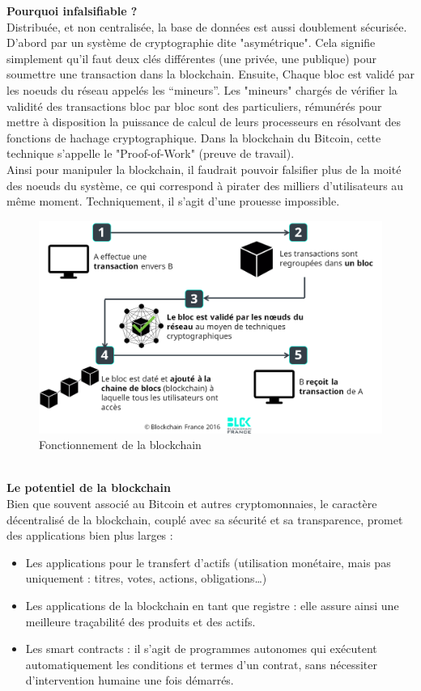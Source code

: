 \documentclass[conference]{IEEEtran}
\begin{document}
\textbf{Pourquoi infalsifiable ? } \\
Distribuée, et non centralisée, la base de données est aussi doublement sécurisée. D'abord par un système de cryptographie dite "asymétrique". Cela signifie simplement qu'il faut deux clés différentes (une privée, une publique) pour soumettre une transaction dans la blockchain. Ensuite, Chaque bloc est validé par les noeuds du réseau appelés les “mineurs”. Les "mineurs" chargés de vérifier la validité des transactions bloc par bloc sont des particuliers, rémunérés pour mettre à disposition la puissance de calcul de leurs processeurs en résolvant des fonctions de hachage cryptographique. Dans la blockchain du Bitcoin, cette technique s'appelle le "Proof-of-Work" (preuve de travail). \cite{7x7} \\
Ainsi pour manipuler la blockchain, il faudrait pouvoir falsifier plus de la moité des noeuds du système, ce qui correspond à pirater des milliers d'utilisateurs au même moment. Techniquement, il s’agit d’une prouesse impossible. \\
\begin{subfigure}
    \centering
    \includegraphics[scale=0.3]{blck-fonctionnement.png}
    \caption{Fonctionnement de la blockchain}
    \label{fig:blck-fonctionnement}
\end{subfigure}
\vspace{0.3cm}\\
\textbf{Le potentiel de la blockchain} \cite{bcfr}\\

Bien que souvent associé au Bitcoin et autres cryptomonnaies, le caractère décentralisé de la blockchain, couplé avec sa sécurité et sa transparence, promet des applications bien plus larges : 
\begin{itemize}
    \item Les applications pour le transfert d’actifs (utilisation monétaire, mais pas uniquement : titres, votes, actions, obligations…)
    \item Les applications de la blockchain en tant que registre : elle assure ainsi une meilleure traçabilité des produits et des actifs.
    \item Les smart contracts : il s’agit de programmes autonomes qui exécutent automatiquement les conditions et termes d’un contrat, sans nécessiter d’intervention humaine une fois démarrés. 
\end{itemize} 
\end{document}
